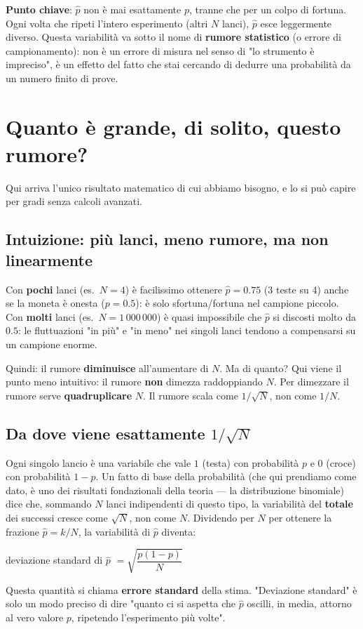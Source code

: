 \documentclass[11pt,a4paper]{article}
\begin{document}
\textbf{Punto chiave}: $\hat p$ non è mai esattamente $p$, tranne che
per un colpo di fortuna. Ogni volta che ripeti l'intero esperimento
(altri $N$ lanci), $\hat p$ esce leggermente diverso. Questa
variabilità va sotto il nome di \textbf{rumore statistico} (o errore di
campionamento): non è un errore di misura nel senso di "lo strumento è
impreciso", è un effetto del fatto che stai cercando di dedurre una
probabilità da un numero finito di prove.

\section{Quanto è grande, di solito, questo rumore?}

Qui arriva l'unico risultato matematico di cui abbiamo bisogno, e lo si
può capire per gradi senza calcoli avanzati.

\subsection*{Intuizione: più lanci, meno rumore, ma non linearmente}

Con \textbf{pochi} lanci (es.\ $N=4$) è facilissimo ottenere
$\hat p=0.75$ (3 teste su 4) anche se la moneta è onesta ($p=0.5$): è
solo sfortuna/fortuna nel campione piccolo. Con \textbf{molti} lanci
(es.\ $N=1\,000\,000$) è quasi impossibile che $\hat p$ si discosti
molto da $0.5$: le fluttuazioni "in più" e "in meno" nei singoli lanci
tendono a compensarsi su un campione enorme.

Quindi: il rumore \textbf{diminuisce} all'aumentare di $N$. Ma di
quanto? Qui viene il punto meno intuitivo: il rumore \textbf{non}
dimezza raddoppiando $N$. Per dimezzare il rumore serve
\textbf{quadruplicare} $N$. Il rumore scala come $1/\sqrt N$, non come
$1/N$.

\subsection*{Da dove viene esattamente $1/\sqrt N$}

Ogni singolo lancio è una variabile che vale $1$ (testa) con
probabilità $p$ e $0$ (croce) con probabilità $1-p$. Un fatto di base
della probabilità (che qui prendiamo come dato, è uno dei risultati
fondazionali della teoria --- la distribuzione binomiale) dice che,
sommando $N$ lanci indipendenti di questo tipo, la variabilità del
\textbf{totale} dei successi cresce come $\sqrt N$, non come $N$.
Dividendo per $N$ per ottenere la frazione $\hat p=k/N$, la variabilità
di $\hat p$ diventa:
\begin{keyeq}
\centering
deviazione standard di $\hat p$ $=\sqrt{\dfrac{p(1-p)}{N}}$
\end{keyeq}
Questa quantità si chiama \textbf{errore standard} della stima.
"Deviazione standard" è solo un modo preciso di dire "quanto ci si
aspetta che $\hat p$ oscilli, in media, attorno al vero valore $p$,
ripetendo l'esperimento più volte".
\end{document}
